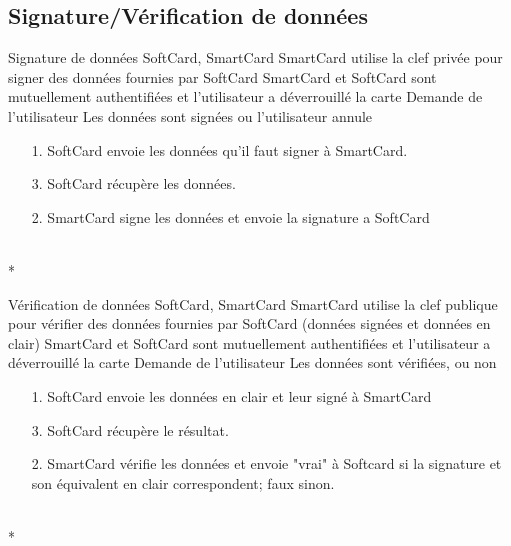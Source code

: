 \documentclass[a4paper,11pt,french]{article}
\begin{document}
\subsection{Signature/Vérification de données}

\fiche
{Signature de données}
	{SoftCard, SmartCard}
    {SmartCard utilise la clef privée pour signer des données fournies par 
    SoftCard}
    { SmartCard et SoftCard sont mutuellement authentifiées et l'utilisateur a
    déverrouillé la carte}
    {Demande de l'utilisateur}
    {Les données sont signées ou l'utilisateur annule}
    {\begin{itemize}
        \item[]
        \item[1.] SoftCard envoie les données qu'il faut signer à SmartCard.
        \item[3.] SoftCard récupère les données.
    \end{itemize}}
	{\begin{itemize}
        \item[]
        \item[2.] SmartCard signe les données et envoie la signature a SoftCard 
	\end{itemize}
	}
	{}
\flots
    {}
    {}
\\*

\fiche
{Vérification de données}
	{SoftCard, SmartCard}
    {SmartCard utilise la clef publique pour vérifier des données fournies par 
    SoftCard (données signées et données en clair)}
    { SmartCard et SoftCard sont mutuellement authentifiées et l'utilisateur a
    déverrouillé la carte}
    {Demande de l'utilisateur}
    {Les données sont vérifiées, ou non}
    {\begin{itemize}
        \item[]
        \item[1.] SoftCard envoie les données en clair et leur signé à SmartCard
        \item[3.] SoftCard récupère le résultat.
    \end{itemize}}
	{\begin{itemize}
        \item[]
        \item[2.] SmartCard vérifie les données et envoie "vrai" à Softcard si la signature et
	son équivalent en clair correspondent; faux sinon.
	\end{itemize}
	}
	{}
\flots
    {}
    {}
\\*

\pagebreak
\end{document}
